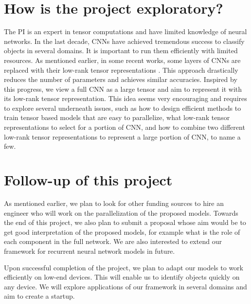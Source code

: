 \documentclass[11pt]{article}
\begin{document}
\section{How is the project exploratory?}

The PI is an expert in tensor computations and have limited knowledge of neural networks. In the last decade,  CNNs have achieved tremendous success to classify objects in several domains. It is important to run them efficiently with limited resources. As mentioned earlier, in some recent works, some layers of CNNs are replaced with their low-rank tensor representations . This approach drastically reduces the number of parameters and achieves similar accuracies. Inspired by this progress, we view a full CNN as a large tensor and aim to represent it with its low-rank tensor representation. This idea seems very encouraging and requires to explore several underneath issues, such as how to design efficient methods to train tensor based models that are easy to parallelize, what low-rank tensor representations to select for a portion of CNN, and how to combine  two different low-rank tensor representations  to represent a large portion of CNN, to name a few.

\section{Follow-up of this project}
As mentioned earlier, we plan to look for other funding sources to hire an engineer who will work on the parallelization of the proposed models. Towards the end of this project, we also plan to submit a proposal whose aim would be to get good interpretation of the proposed models, for example what is the role of each component in the full network. We are also interested to extend our framework for recurrent neural network models in future. 

Upon successful completion of the project, we plan to adapt our models to work efficiently on low-end devices. This will enable us to  identify objects quickly on any device. We will explore applications of our framework in several domains and aim to create a startup.


%
%
\end{document}
